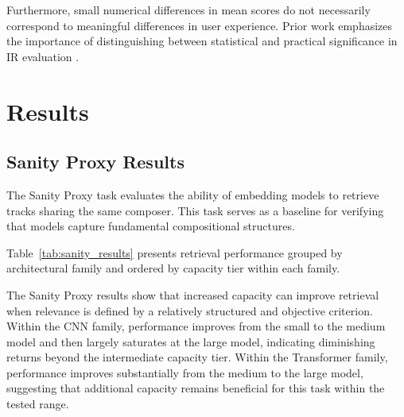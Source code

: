 \documentclass{article}
\begin{document}
Furthermore, small numerical differences in mean scores do not necessarily correspond 
to meaningful differences in user experience. Prior work emphasizes the importance 
of distinguishing between statistical and practical significance in IR evaluation 
\cite{urbano2013}.





\section{Results}\label{sec:results}\label{ch:results}
\subsection{Sanity Proxy Results}

The Sanity Proxy task evaluates the ability of embedding models to retrieve tracks sharing the same composer. This task serves as a baseline for verifying that models capture fundamental compositional structures.

Table~\ref{tab:sanity_results} presents retrieval performance grouped by architectural family and ordered by capacity tier within each family.

\begin{table}[!htbp]
\centering
\caption{Sanity Proxy Results (Composer Retrieval). Metrics reported are corpus-level mean values at rank 5.}
\label{tab:sanity_results}
\end{table}

The Sanity Proxy results show that increased capacity can improve retrieval when relevance is defined
by a relatively structured and objective criterion. Within the CNN family, performance improves from
the small to the medium model and then largely saturates at the large model, indicating diminishing
returns beyond the intermediate capacity tier. Within the Transformer family, performance improves
substantially from the medium to the large model, suggesting that additional capacity remains
beneficial for this task within the tested range.
\end{document}
